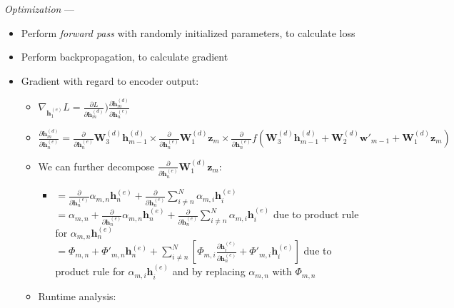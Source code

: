 \emph{Optimization} ---
\begin{itemize}
    \item Perform \emph{forward pass} with randomly initialized parameters, to calculate loss
    \item Perform backpropagation, to calculate gradient
    \item Gradient with regard to encoder output:
    \begin{itemize}
        \item $\nabla_{\boldsymbol{h}_1^{(e)}} L = \frac{\partial L}{\partial \boldsymbol{h}_m^{(d)}} ) \frac{\partial \boldsymbol{h}_m^{(d)}}{\partial \boldsymbol{h}_{n}^{(e)}}$
        \item $\frac{\partial \boldsymbol{h}_m^{(d)}}{\partial \boldsymbol{h}_{n}^{(e)}} = \frac{\partial}{\partial \boldsymbol{h}_{n}^{(e)}} \boldsymbol{W}_3^{(d)} \boldsymbol{h}_{m-1}^{(d)}
        \times \frac{\partial}{\partial \boldsymbol{h}_{n}^{(e)}} \boldsymbol{W}_1^{(d)} \boldsymbol{z}_m
        \times \frac{\partial}{\partial \boldsymbol{h}_{n}^{(e)}} f ( \boldsymbol{W}_3^{(d)} \boldsymbol{h}_{m-1}^{(d)} + \boldsymbol{W}_2^{(d)} \boldsymbol{w'}_{m-1} + \boldsymbol{W}_1^{(d)} \boldsymbol{z}_m )$
        \item We can further decompose $\frac{\partial}{\partial \boldsymbol{h}_{n}^{(e)}} \boldsymbol{W}_1^{(d)} \boldsymbol{z}_m$:
        \begin{itemize}
            \item $
            =\frac{\partial}{\partial \boldsymbol{h}_n^{(e)}} \alpha_{m,n} \boldsymbol{h}_n^{(e)} + \frac{\partial}{\partial \boldsymbol{h}_n^{(e)}} \sum_{i \neq n}^N \alpha_{m,i} \boldsymbol{h}_i^{(e)}
            $\\
            $
            = \alpha_{m,n} + \frac{\partial}{\partial \boldsymbol{h}_n^{(e)}} \alpha_{m,n}\boldsymbol{h}_n^{(e)} + \frac{\partial}{\partial \boldsymbol{h}_n^{(e)}} \sum_{i \neq n}^N \alpha_{m,i} \boldsymbol{h}_i^{(e)}
            $ due to product rule for $\alpha_{m,n} \boldsymbol{h}_n^{(e)}$\\
            $
            = \Phi_{m,n} + \Phi'_{m,n} \boldsymbol{h}_n^{(e)} + \sum_{i \neq n}^N \left[\Phi_{m,i} \frac{\partial \boldsymbol{h}_i^{(e)}}{\partial \boldsymbol{h}_n^{(e)}} + \Phi'_{m,i} \boldsymbol{h}_i^{(e)} \right]
            $ due to product rule for $\alpha_{m,i} \boldsymbol{h}_i^{(e)}$ and by replacing $\alpha_{m,n}$ with $\Phi_{m,n}$
        \end{itemize}
        \item Runtime analysis:

\end{itemize}
\end{itemize}
